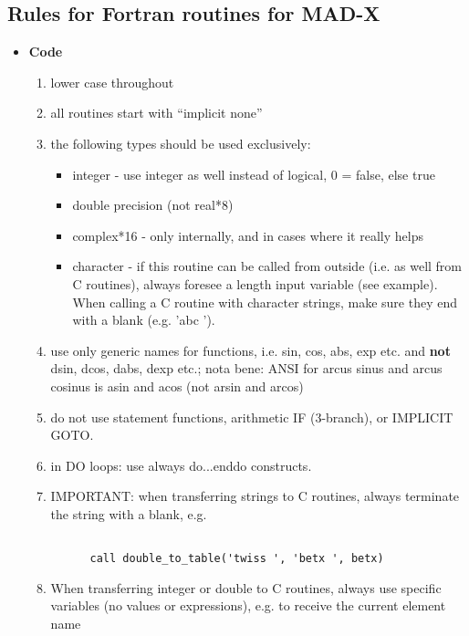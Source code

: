 \subsection{ Rules for Fortran routines for MAD-X}
\begin{itemize}
	\item \textbf{ Code}
\begin{enumerate}
	\item lower case throughout
	\item all routines start with ``implicit none''
	\item the following types should be used exclusively:    
\begin{itemize}
	\item integer - use integer as well instead of logical, 0 = false,          else true
	\item double precision (not real*8)
	\item complex*16 - only internally, and in cases where it really helps
	\item character - if this routine can be called from outside      (i.e. as well from C routines), always foresee a length input      variable (see example). When calling a C routine with character strings,      make sure they end with a blank (e.g. 'abc ').   
\end{itemize}
	\item use only generic names for functions, i.e. sin, cos, abs, exp     etc. and \textbf{ not} dsin, dcos, dabs, dexp etc.; nota bene: ANSI     for arcus sinus and arcus cosinus is asin and acos (not arsin and arcos)  
	\item do not use statement functions, arithmetic IF (3-branch), or IMPLICIT GOTO.  
	\item in DO loops: use always do...enddo constructs.  
	\item IMPORTANT: when transferring  strings to C routines, always terminate     the string with a blank, e.g. 
\begin{verbatim}

      call double_to_table('twiss ', 'betx ', betx)
\end{verbatim}
	\item When transferring  integer or double to C routines, always use     specific variables (no values or expressions), e.g. to receive the     current element name 
\begin{verbatim}


\end{verbatim}
\end{enumerate}
\end{itemize}

